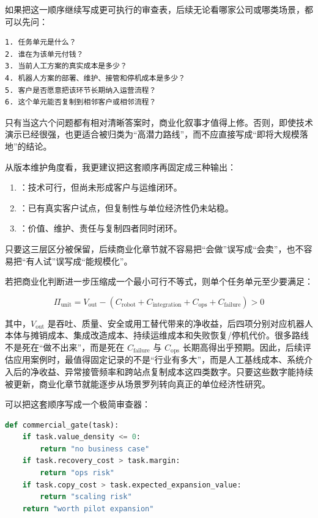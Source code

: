 如果把这一顺序继续写成更可执行的审查表，后续无论看哪家公司或哪类场景，都可以先问：

\begin{lstlisting}
1. 任务单元是什么？
2. 谁在为该单元付钱？
3. 当前人工方案的真实成本是多少？
4. 机器人方案的部署、维护、接管和停机成本是多少？
5. 客户是否愿意把该环节长期纳入运营流程？
6. 这个单元能否复制到相邻客户或相邻流程？
\end{lstlisting}

只有当这六个问题都有相对清晰答案时，商业化叙事才值得上修。否则，即使技术演示已经很强，也更适合被归类为“高潜力路线”，而不应直接写成“即将大规模落地”的结论。

从版本维护角度看，我更建议把这套顺序再固定成三种输出：

\begin{enumerate}
\item \texttt{}：技术可行，但尚未形成客户与运维闭环。
\item \texttt{}：已有真实客户试点，但复制性与单位经济性仍未站稳。
\item \texttt{}：价值、维护、责任与复制四者同时闭环。
\end{enumerate}

只要这三层区分被保留，后续商业化章节就不容易把“会做”误写成“会卖”，也不容易把“有人试”误写成“能规模化”。

若把商业化判断进一步压缩成一个最小可行不等式，则单个任务单元至少要满足：

\begingroup
\scriptsize
\begin{equation*}
\Pi_{\text{unit}} = V_{\text{out}} - (C_{\text{robot}} + C_{\text{integration}} + C_{\text{ops}} + C_{\text{failure}}) > 0
\end{equation*}
\endgroup

其中，\(V_{\text{out}}\) 是吞吐、质量、安全或用工替代带来的净收益，后四项分别对应机器人本体与摊销成本、集成改造成本、持续运维成本和失败恢复/停机代价。很多路线不是死在“做不出来”，而是死在 \(C_{\text{failure}}\) 与 \(C_{\text{ops}}\) 长期高得出乎预期。因此，后续评估应用案例时，最值得固定记录的不是“行业有多大”，而是人工基线成本、系统介入后的净收益、异常接管频率和跨站点复制成本这四类数字。只要这些数字能持续被更新，商业化章节就能逐步从场景罗列转向真正的单位经济性研究。

可以把这套顺序写成一个极简审查器：

\begin{lstlisting}[language=python]
def commercial_gate(task):
    if task.value_density <= 0:
        return "no business case"
    if task.recovery_cost > task.margin:
        return "ops risk"
    if task.copy_cost > task.expected_expansion_value:
        return "scaling risk"
    return "worth pilot expansion"
\end{lstlisting}

